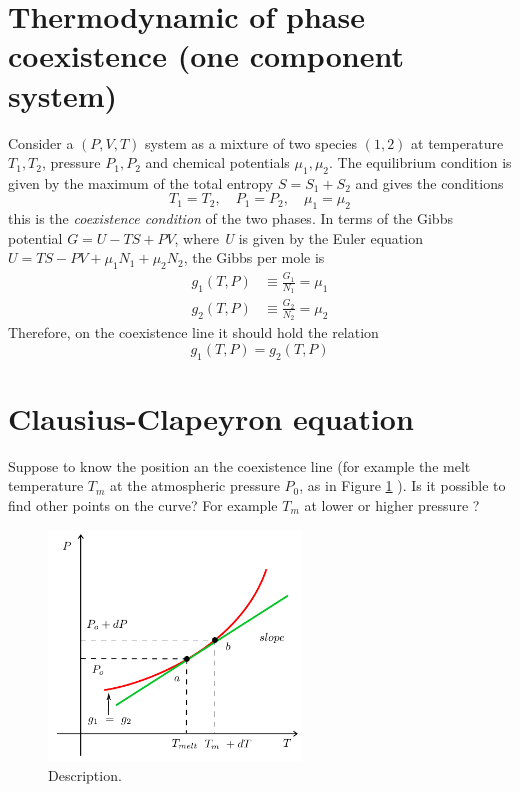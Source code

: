 \documentclass[../main/main.tex]{subfiles}
\begin{document}
\section{Thermodynamic of phase coexistence (one component system)}
Consider a \( (P,V,T) \) system as a mixture of two species \( (1,2) \) at temperature \( T_1, T_2 \), pressure \( P_1, P_2 \) and chemical potentials \( \mu _1,\mu _2 \). The equilibrium condition is given by the maximum of the total entropy \( S = S_1 + S_2 \) and gives the conditions
\begin{equation}
  T_1 = T_2, \quad P_1 = P_2, \quad \mu _1 = \mu _2
  \label{eq:}
\end{equation}
this is the \emph{coexistence condition} of the two phases.
In terms of the Gibbs potential \( G = U- TS+PV \), where \emph{U} is given by  the Euler equation \( U = TS-PV+ \mu _1 N_1 + \mu _2 N_2 \), the Gibbs per mole is
\begin{subequations}
\begin{align}
  g_1 (T,P) &\equiv \frac{G_1}{N_1} = \mu _1 \\
  g_2 (T,P) &\equiv \frac{G_2}{N_2} = \mu _2
\end{align}
\label{}
\end{subequations}
Therefore, on the coexistence line it should hold the relation
\begin{equation}
  g_1 (T,P) = g_2 (T,P)
  \label{eq:}
\end{equation}

\section{Clausius-Clapeyron equation}
Suppose to know the position an the coexistence line (for example the melt temperature \( T_m \) at the atmospheric pressure \( P_0 \), as in Figure \ref{fig:3_1}  ). Is it possible to find other points on the curve? For example \( T_m \) at lower or higher pressure ?

\begin{figure}[h!]
\centering
\includegraphics[width=0.6\textwidth]{../lessons/3_image/2.pdf}
\caption{\label{fig:3_1} Description.}
\end{figure}
\end{document}
